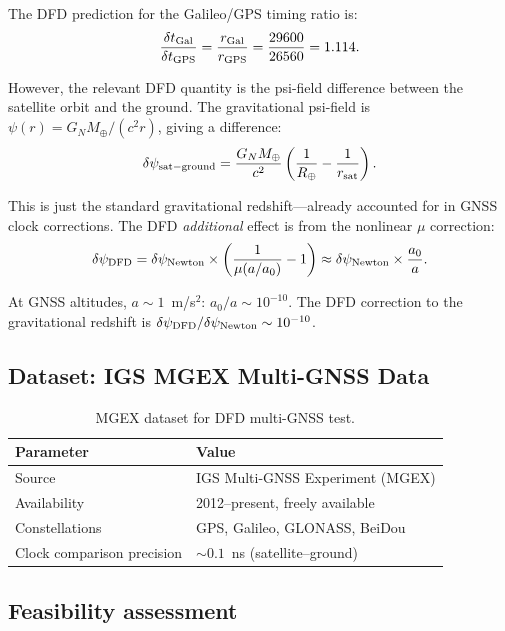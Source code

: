 \documentclass[11pt]{article}
\newcommand{\aM}{a_0}
\newcommand{\mufd}{\mu}
\newcommand{\GN}{G_N}
\begin{document}
The DFD prediction for the Galileo/GPS timing ratio is:
\begin{equation}
\frac{\delta t_{\rm Gal}}{\delta t_{\rm GPS}}
= \frac{r_{\rm Gal}}{r_{\rm GPS}} = \frac{29600}{26560} = 1.114.
\end{equation}

However, the relevant DFD quantity is the psi-field difference between
the satellite orbit and the ground. The gravitational psi-field is
$\psi(r) = \GN M_\oplus/(c^2 r)$, giving a difference:
\begin{equation}
\delta\psi_{\rm sat-ground} = \frac{\GN M_\oplus}{c^2}
\left(\frac{1}{R_\oplus} - \frac{1}{r_{\rm sat}}\right).
\end{equation}

This is just the standard gravitational redshift---already accounted
for in GNSS clock corrections. The DFD \emph{additional} effect is
from the nonlinear $\mufd$ correction:
\begin{equation}
\delta\psi_{\rm DFD} = \delta\psi_{\rm Newton}\times
\left(\frac{1}{\mufd(a/\aM)} - 1\right)
\approx \delta\psi_{\rm Newton}\times\frac{\aM}{a}.
\end{equation}

At GNSS altitudes, $a \sim 1$~m/s$^2$: $\aM/a \sim 10^{-10}$.
The DFD correction to the gravitational redshift is
$\delta\psi_{\rm DFD}/\delta\psi_{\rm Newton} \sim 10^{-10}$.

\subsection{Dataset: IGS MGEX Multi-GNSS Data}

\begin{table}[H]
\centering
\caption{MGEX dataset for DFD multi-GNSS test.}
\begin{tabular}{ll}
\toprule
\textbf{Parameter} & \textbf{Value} \\
\midrule
Source & IGS Multi-GNSS Experiment (MGEX) \\
Availability & 2012--present, freely available \\
Constellations & GPS, Galileo, GLONASS, BeiDou \\
Clock comparison precision & $\sim 0.1$~ns (satellite--ground) \\
\bottomrule
\end{tabular}
\end{table}

\subsection{Feasibility assessment}
\end{document}
